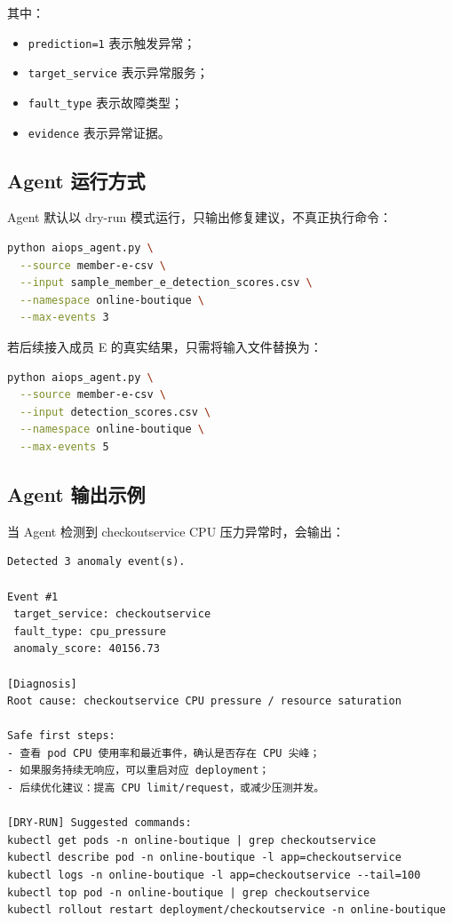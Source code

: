 \documentclass[UTF8,a4paper,12pt]{ctexart}
\begin{document}
其中：

\begin{itemize}
    \item \texttt{prediction=1} 表示触发异常；
    \item \texttt{target\_service} 表示异常服务；
    \item \texttt{fault\_type} 表示故障类型；
    \item \texttt{evidence} 表示异常证据。
\end{itemize}

\subsection{Agent 运行方式}

Agent 默认以 dry-run 模式运行，只输出修复建议，不真正执行命令：

\begin{lstlisting}[language=bash]
python aiops_agent.py \
  --source member-e-csv \
  --input sample_member_e_detection_scores.csv \
  --namespace online-boutique \
  --max-events 3
\end{lstlisting}

若后续接入成员 E 的真实结果，只需将输入文件替换为：

\begin{lstlisting}[language=bash]
python aiops_agent.py \
  --source member-e-csv \
  --input detection_scores.csv \
  --namespace online-boutique \
  --max-events 5
\end{lstlisting}

\subsection{Agent 输出示例}

当 Agent 检测到 checkoutservice CPU 压力异常时，会输出：

\begin{lstlisting}
Detected 3 anomaly event(s).

Event #1
 target_service: checkoutservice
 fault_type: cpu_pressure
 anomaly_score: 40156.73

[Diagnosis]
Root cause: checkoutservice CPU pressure / resource saturation

Safe first steps:
- 查看 pod CPU 使用率和最近事件，确认是否存在 CPU 尖峰；
- 如果服务持续无响应，可以重启对应 deployment；
- 后续优化建议：提高 CPU limit/request，或减少压测并发。

[DRY-RUN] Suggested commands:
kubectl get pods -n online-boutique | grep checkoutservice
kubectl describe pod -n online-boutique -l app=checkoutservice
kubectl logs -n online-boutique -l app=checkoutservice --tail=100
kubectl top pod -n online-boutique | grep checkoutservice
kubectl rollout restart deployment/checkoutservice -n online-boutique
\end{lstlisting}
\end{document}

